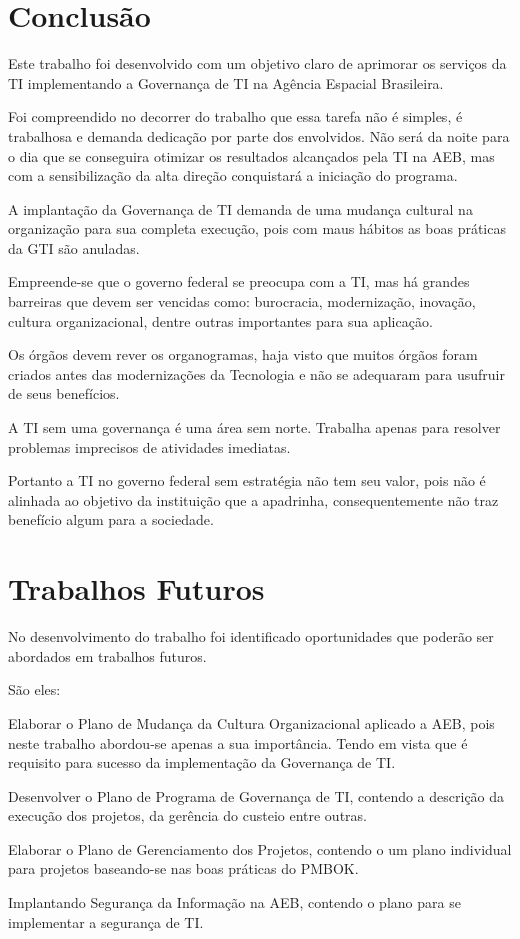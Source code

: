 \section{Conclusão}\label{concl}

Este trabalho foi desenvolvido com um objetivo claro de aprimorar os serviços da TI implementando a Governança de TI na Agência Espacial Brasileira. 

Foi compreendido no decorrer do trabalho que essa tarefa não é simples, é trabalhosa e demanda dedicação por parte dos envolvidos. Não será da noite para o dia que se conseguira otimizar os resultados alcançados pela TI na AEB, mas com a sensibilização da alta direção conquistará a iniciação do programa.

A implantação da Governança de TI demanda de uma mudança cultural na organização para sua completa execução, pois com maus hábitos as boas práticas da GTI são anuladas.

Empreende-se que o governo federal se preocupa com a TI, mas há grandes barreiras que devem ser vencidas como: burocracia, modernização, inovação, cultura organizacional, dentre outras importantes para sua aplicação. 

Os órgãos devem rever os organogramas, haja visto que muitos órgãos foram criados antes das modernizações da Tecnologia e não se adequaram para usufruir de seus benefícios. 

A TI sem uma governança é uma área sem norte. Trabalha apenas para resolver problemas imprecisos de atividades imediatas.

Portanto a TI no governo federal sem estratégia não tem seu valor, pois não é alinhada ao objetivo da instituição que a apadrinha, consequentemente não traz benefício algum para a sociedade.

\section{Trabalhos Futuros}\label{trabFut}

No desenvolvimento do trabalho foi identificado oportunidades que poderão ser abordados em trabalhos futuros.

São eles:

Elaborar o Plano de Mudança da Cultura Organizacional aplicado a AEB, pois neste trabalho abordou-se apenas a sua importância. Tendo em vista que é requisito para sucesso da implementação da Governança de TI.

Desenvolver o Plano de Programa de Governança de TI, contendo a descrição da execução dos projetos, da gerência do custeio entre outras.

Elaborar o Plano de Gerenciamento dos Projetos, contendo o um plano individual para projetos baseando-se nas boas práticas do PMBOK.

Implantando Segurança da Informação na AEB, contendo o plano para se implementar a segurança de TI.
 